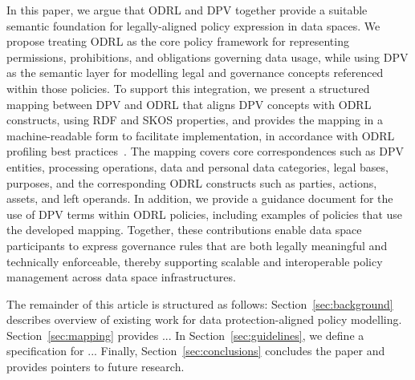 In this paper,
we argue that ODRL and DPV together
provide a suitable semantic foundation
for legally-aligned policy expression in data spaces.
We propose treating ODRL as the core policy framework
for representing permissions, prohibitions, and
obligations governing data usage,
while using DPV as the semantic layer
for modelling legal and governance concepts
referenced within those policies.
To support this integration,
we present a structured mapping between DPV and ODRL
that aligns DPV concepts with ODRL constructs,
using RDF and SKOS properties,
and provides the mapping in a machine-readable form
to facilitate implementation,
in accordance with ODRL profiling best practices~\cite{steidl_odrl_2023}.
The mapping covers core correspondences such as
DPV entities, processing operations,
data and personal data categories,
legal bases, purposes, and
the corresponding ODRL constructs
such as parties, actions, assets, and left operands.
In addition,
we provide a guidance document for the use of
DPV terms within ODRL policies,
including examples of policies that use the developed mapping.
Together,
these contributions enable data space participants
to express governance rules that are both legally meaningful
and technically enforceable,
thereby supporting scalable and
interoperable policy management
across data space infrastructures.

The remainder of this article is structured as follows:
Section~\ref{sec:background} describes overview of existing work for data protection-aligned policy modelling.
Section~\ref{sec:mapping} provides ...
In Section~\ref{sec:guidelines}, we define a specification for ...
Finally, Section~\ref{sec:conclusions} concludes the paper and provides pointers to future research.
